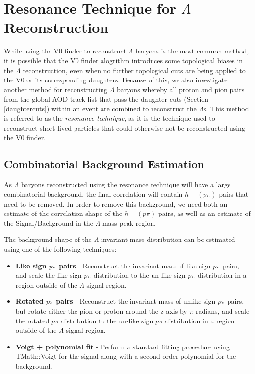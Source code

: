 \documentclass[ALICE,manyauthors]{ALICE_analysis_notes}
\begin{document}
\section{Resonance Technique for $\Lambda$ Reconstruction}
\label{resonance_technique}

While using the V0 finder to reconstruct $\Lambda$ baryons is the most common method, it is possible that the V0 finder alogrithm introduces some topological biases in the $\Lambda$ reconstruction, even when no further topological cuts are being applied to the V0 or its corresponding daughters. Because of this, we also investigate another method for reconstructing $\Lambda$ baryons whereby all proton and pion pairs from the global AOD track list that pass the daughter cuts (Section \ref{daughtercuts}) within an event are combined to reconstruct the $\Lambda$s. This method is referred to as the \textit{resonance technique}, as it is the technique used to reconstruct short-lived particles that could otherwise not be reconstructed using the V0 finder.

\subsection{Combinatorial Background Estimation}
\label{combinatorial_background}

As $\Lambda$ baryons reconstructed using the resonance technique will have a large combinatorial background, the final correlation will contain $h-(p\pi)$ pairs that need to be removed. In order to remove this background, we need both an estimate of the correlation shape of the $h-(p\pi)$ pairs, as well as an estimate of the Signal/Background in the $\Lambda$ mass peak region.

 The background shape of the $\Lambda$ invariant mass distribution can be estimated using one of the following techniques:

 \begin{itemize}
	\item \textbf{Like-sign $p\pi$ pairs} - Reconstruct the invariant mass of like-sign $p\pi$ pairs, and scale the like-sign $p\pi$ distribution to the un-like sign $p\pi$ distribution in a region outside of the $\Lambda$ signal region.
	\item \textbf{Rotated $p\pi$ pairs} - Reconstruct the invariant mass of unlike-sign $p\pi$ pairs, but rotate either the pion or proton around the z-axis by $\pi$ radians, and scale the rotated $p\pi$ distribution to the un-like sign $p\pi$ distribution in a region outside of the $\Lambda$ signal region.
	\item \textbf{Voigt + polynomial fit} - Perform a standard fitting procedure using TMath::Voigt for the signal along with a second-order polynomial for the background.
 \end{itemize}
\end{document}
